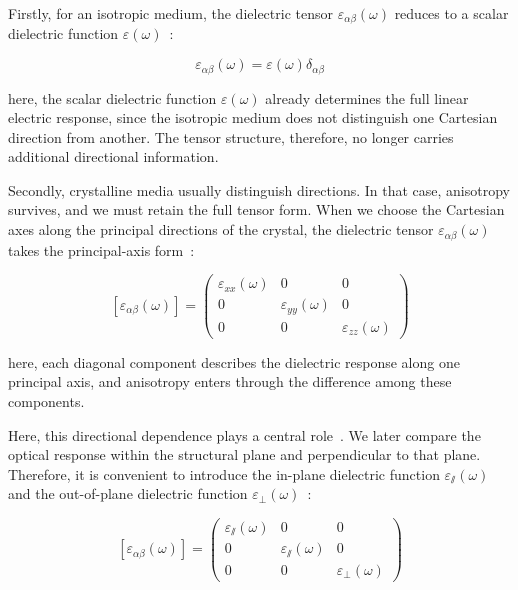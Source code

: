 Firstly, for an isotropic medium,
the dielectric tensor $\varepsilon_{\alpha\beta}(\omega)$ reduces to a scalar dielectric function $\varepsilon(\omega)$~\cite{born2013principles}:

\begin{equation}
    \varepsilon_{\alpha\beta}(\omega)
    = \varepsilon(\omega)\delta_{\alpha\beta}
\label{isotropic_dielectric_tensor}
\end{equation}

here, the scalar dielectric function $\varepsilon(\omega)$ already determines the full linear electric response,
since the isotropic medium does not distinguish one Cartesian direction from another.
The tensor structure, therefore, no longer carries additional directional information.

Secondly, crystalline media usually distinguish directions.
In that case, anisotropy survives, and we must retain the full tensor form.
When we choose the Cartesian axes along the principal directions of the crystal,
the dielectric tensor $\varepsilon_{\alpha\beta}(\omega)$ takes the principal-axis form~\cite{nye1985physical}:

\begin{equation}
    \left[\varepsilon_{\alpha\beta}(\omega)\right] = \begin{pmatrix}
        \varepsilon_{xx}(\omega) & 0 & 0 \\
        0 & \varepsilon_{yy}(\omega) & 0 \\
        0 & 0 & \varepsilon_{zz}(\omega)
    \end{pmatrix}
\label{principal_axis_dielectric_tensor}
\end{equation}

here, each diagonal component describes the dielectric response along one principal axis,
and anisotropy enters through the difference among these components.

Here, this directional dependence plays a central role~\cite{slavich2024exploring}.
We later compare the optical response within the structural plane and perpendicular to that plane.
Therefore, it is convenient to introduce the in-plane dielectric function $\varepsilon_{\varparallel}(\omega)$ and the out-of-plane dielectric function $\varepsilon_{\perp}(\omega)$~\cite{nye1985physical,guo2021complete,matthes2016influence}:

\begin{equation}
    \left[\varepsilon_{\alpha\beta}(\omega)\right] = \begin{pmatrix}
        \varepsilon_{\varparallel}(\omega) & 0 & 0 \\
        0 & \varepsilon_{\varparallel}(\omega) & 0 \\
        0 & 0 & \varepsilon_{\perp}(\omega)
    \end{pmatrix}
\label{inplane_outofplane_dielectric_tensor}
\end{equation}

